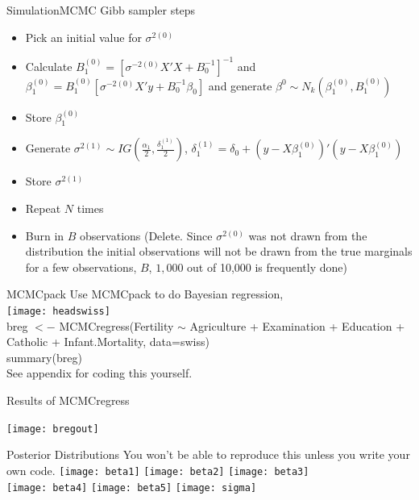 \documentclass[table]{beamer}
\begin{document}
\begin{frame}{Simulation}{MCMC}
	Gibb sampler steps
	\begin{itemize}
		\item Pick an initial value for $ \sigma^{2(0)} $
		\item Calculate $ B_1^{(0)} = [\sigma^{-2(0)} X'X + B_0^{-1}]^{-1}$ and $ \beta_1^{(0)} = B_1^{(0)}[\sigma^{-2(0)}X'y + B_0^{-1}\beta_0 ] $ and generate $ \beta^{0} \sim N_k(\beta_1^{(0)}, B_1^{(0)}) $
		\item Store $ \beta_1^{(0)} $
		\item Generate $ \sigma^{2(1)} \sim IG(\frac{\alpha_1}{2}, \frac{\delta_1^{ (1) }} {2}  )$, $ \delta_1^{(1)} = \delta_0 + (y-X\beta_1^{(0)})'(y-X\beta_1^{(0)}) $
		\item Store $ \sigma^{2(1)} $
		\item Repeat $ N $ times
		\item Burn in $ B $ observations (Delete. Since $ \sigma^{2(0)} $ was not drawn from the distribution the initial observations will not be drawn from the true marginals for a few observations, $ B $, $ 1,000 $ out of 10,000 is frequently done)
	\end{itemize}
\end{frame}

\begin{frame}{MCMCpack}
	Use MCMCpack to do Bayesian regression, \\
	\texttt{[image: headswiss]}\\
	breg $<-$ MCMCregress(Fertility $ \sim $ Agriculture + Examination + Education + Catholic + Infant.Mortality, data=swiss)\\
	summary(breg)\\
	See appendix for coding this yourself. 
\end{frame}

\begin{frame}{Results of MCMCregress}
	\begin{center}
	\texttt{[image: bregout]}
	\end{center}
\end{frame}

\begin{frame}{Posterior Distributions}
	You won't be able to reproduce this unless you write your own code.
	\centering 
		\texttt{[image: beta1]} \hspace{.75cm} \texttt{[image: beta2]} \hspace{.75cm} \texttt{[image: beta3]}\\
	\centering 
		\texttt{[image: beta4]} \hspace{.75cm} \texttt{[image: beta5]} \hspace{.75cm} \texttt{[image: sigma]}
\end{frame}
\end{document}

